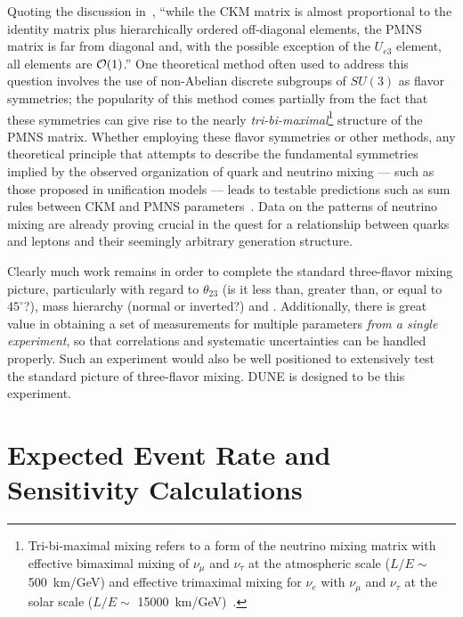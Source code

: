 Quoting the discussion in~\cite{deGouvea:2013onf}, ``while the CKM
matrix is almost proportional to the identity matrix plus
hierarchically ordered off-diagonal elements, the PMNS matrix is far
from diagonal and, with the possible exception of the $U_{e3}$
element, all elements are ${\cal O}(1)$.''
One theoretical method often used to address this question involves the use of non-Abelian discrete
subgroups of $SU(3)$ as flavor symmetries; the popularity of this method comes partially from
the fact that these symmetries can give rise to the nearly \emph{tri-bi-maximal}\footnote{Tri-bi-maximal mixing refers to a form of the neutrino mixing matrix with effective bimaximal mixing of $\nu_\mu$ and $\nu_\tau$
at the atmospheric scale ($L/E \sim$ \SI{500}{\km / \GeV}) and effective trimaximal
mixing for $\nu_e$ with $\nu_\mu$ and $\nu_\tau$ 
at the solar scale ($L/E \sim$ \SI{15000}{\km / \GeV})~\cite{Harrison:2002er}.} 
structure of the PMNS matrix.
Whether employing these flavor symmetries or other methods,
any theoretical principle that attempts to describe the fundamental
symmetries implied by the observed organization of quark and neutrino
mixing --- such as those proposed in unification models --- leads to
testable predictions such as sum rules between CKM and PMNS
parameters~\cite{King:2014nza,deGouvea:2013onf,Mohapatra:2005wg,Albright:2006cw}.
Data on the patterns of neutrino mixing 
are already proving crucial in the quest for a 
relationship between quarks and leptons and their seemingly arbitrary generation
structure.  

Clearly much work remains in order to complete the standard three-flavor 
mixing picture, particularly 
with regard to $\theta_{23}$ (is it less than, greater than, or equal
to $45^\circ$?), mass hierarchy (normal or inverted?) 
and \deltacp.
Additionally, there is 
great value in obtaining a set of measurements for multiple parameters 
\emph{from a single experiment}, so that correlations and systematic 
uncertainties can be handled properly.  Such an experiment would also be 
well positioned to extensively test the standard picture of three-flavor mixing.  
DUNE is designed to be this experiment.

\section{Expected Event Rate and Sensitivity Calculations}
\label{sec:physics-lbnosc-senscalc}

